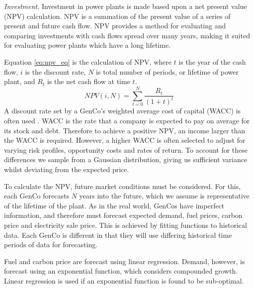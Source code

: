 \textit{Investment.} Investment in power plants is made based upon a net present value (NPV) calculation. NPV is a summation of the present value of a series of present and future cash flow. NPV provides a method for evaluating and comparing investments with cash flows spread over many years, making it suited for evaluating power plants which have a long lifetime.  

Equation \ref{eq:npv_eq} is the calculation of NPV, where $t$ is the year of the cash flow, $i$ is the discount rate, $N$ is total number of periods, or lifetime of power plant, and $R_t$ is the net cash flow at time $t$.
\begin{equation} \label{eq:npv_eq}
NPV(i, N) = \sum_{t=0}^{N}\frac{R_t}{(1+t)^t}
\end{equation}
A discount rate set by a GenCo's weighted average cost of capital (WACC) is often used \cite{KincheloeStephenC1990TWAC}. WACC is the rate that a company is expected to pay on average for its stock and debt. Therefore to achieve a positive NPV, an income larger than the WACC is required. However, a higher WACC is often selected to adjust for varying risk profiles, opportunity costs and rates of return. To account for these differences we sample from a Gaussian distribution, giving us sufficient variance whilst deviating from the expected price.

To calculate the NPV, future market conditions must be considered. For this, each GenCo forecasts $N$ years into the future, which we assume is representative of the lifetime of the plant. As in the real world, GenCos have imperfect information, and therefore must forecast expected demand, fuel prices, carbon price and electricity sale price. This is achieved by fitting functions to historical data. Each GenCo is different in that they will use differing historical time periods of data for forecasting.

Fuel and carbon price are forecast using linear regression. Demand, however, is forecast using an exponential function, which considers compounded growth. Linear regression is used if an exponential function is found to be sub-optimal.

